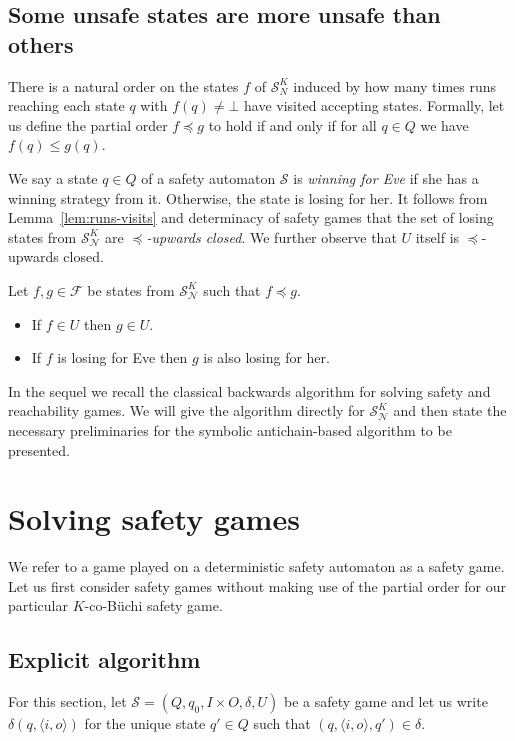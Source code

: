 \documentclass[runningheads,a4paper,draft]{llncs}
\newcommand{\eve}{Eve\xspace}
\newcommand{\calN}{\mathcal{N}}
\newcommand{\calS}{\mathcal{S}}
\begin{document}
\subsection{Some unsafe states are more unsafe than others}
There is a natural order on the states $f$ of $\calS^K_N$ induced by how many
times runs reaching each state $q$ with $f(q) \neq \bot$ have visited
accepting states. Formally, let us define the partial order $f \preceq g$
to hold if and only if for all $q \in Q$ we have $f(q) \leq g(q)$.

We say a state $q \in Q$ of a safety automaton $\calS$ is \emph{winning for
  \eve} if she has a winning strategy from it. Otherwise, the state is losing
for her. It follows from Lemma~\ref{lem:runs-visits} and determinacy of
safety games that the set of losing states from $\calS^K_\calN$ are
\emph{$\preceq$-upwards closed}. We further observe that $U$ itself is
$\preceq$-upwards closed.
\begin{proposition}\label{pro:up-closed}
  Let $f,g \in \mathcal{F}$ be states from $\calS^K_\calN$ such that $f
  \preceq g$.
  \begin{itemize}
    \item If $f \in U$ then $g \in U$.
    \item If $f$ is losing for \eve then $g$ is also losing for her.
  \end{itemize}
\end{proposition}

In the sequel we recall the classical backwards algorithm for solving safety
and reachability games. We will give the algorithm directly for
$\calS^K_\calN$ and then state the necessary preliminaries for the symbolic
antichain-based algorithm to be presented.

\section{Solving safety games}
We refer to a game played on a deterministic safety automaton as a safety
game. Let us first consider safety games without making use of the partial
order for our particular $K$-co-B\"uchi safety game.

\subsection{Explicit algorithm}
For this section, let $\calS = (Q,q_0, I\times O, \delta, U)$ be a safety
game and let us write $\delta(q,\langle i, o \rangle)$ for the unique state
$q' \in Q$ such that $(q, \langle i, o \rangle, q') \in \delta$.
\end{document}
